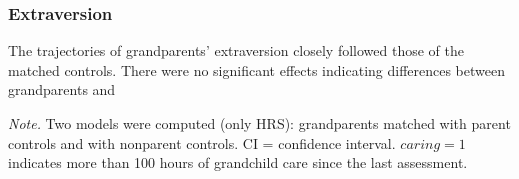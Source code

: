 \documentclass[
  english,
  man,floatsintext]{apa7}
\newenvironment{lltable}{\begin{landscape}\begin{center}\begin{ThreePartTable}}{\end{ThreePartTable}\end{center}\end{landscape}}
\begin{document}
\hypertarget{extraversion}{%
\subsubsection{Extraversion}\label{extraversion}}

The trajectories of grandparents' extraversion closely followed those of the matched controls. There were no significant effects indicating differences between grandparents and




\begin{lltable}

\begin{TableNotes}[para]
\normalsize{\textit{Note.} Two models were computed (only HRS): grandparents matched with parent controls and with nonparent controls. CI = confidence interval. \(caring=1\) indicates more than 100 hours of grandchild care since the last assessment.}
\end{TableNotes}

\footnotesize{

}
\end{lltable}
\end{document}
